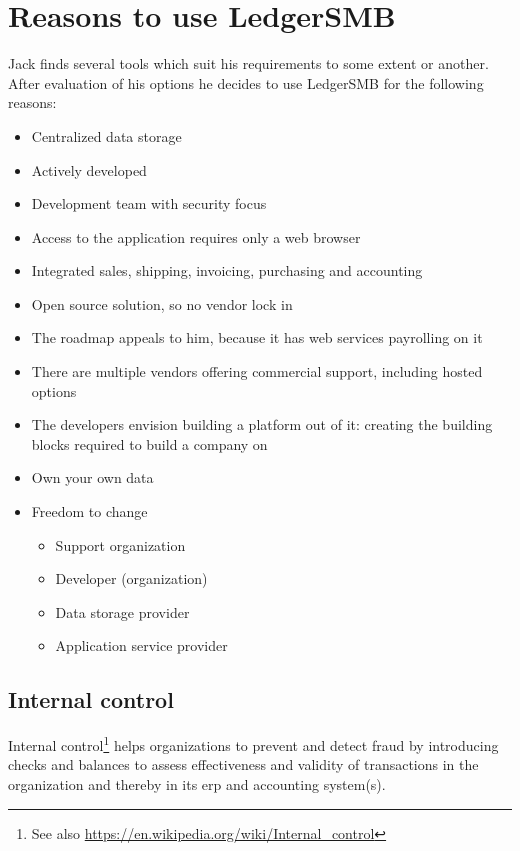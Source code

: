 \chapter{Reasons to use LedgerSMB}
\label{cha-advocacy}

Jack finds several tools which suit his requirements to some extent or another.
After evaluation of his options he decides to use LedgerSMB for the following reasons:

\begin{itemize}
\item Centralized data storage
\item Actively developed
\item Development team with security focus
\item Access to the application requires only a web browser
\item Integrated sales, shipping, invoicing, purchasing and accounting
\item Open source solution, so no vendor lock in
\item The roadmap appeals to him, because it has web services payrolling on it
\item There are multiple vendors offering commercial support, including hosted options
\item The developers envision building a platform out of it: creating the building blocks
required to build a company on
\end{itemize}


\begin{itemize}
\item Own your own data
\item Freedom to change
        \begin{itemize}
        \item Support organization
        \item Developer (organization)
        \item Data storage provider
        \item Application service provider
        \end{itemize}
\end{itemize}

\section{Internal control}
\label{sec-advocacy-internal-control}

Internal control\footnote{See also \url{https://en.wikipedia.org/wiki/Internal_control}}
helps organizations to prevent and detect fraud by introducing checks and balances
to assess effectiveness and validity of transactions in the organization and thereby
in its \gls{erp} and accounting system(s).

